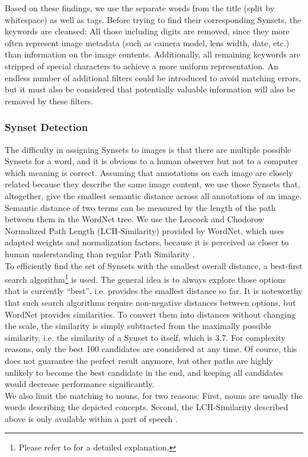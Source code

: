 Based on these findings, we use the separate words from the title (split by whitespace) as well as tags. Before trying to find their corresponding Synsets, the keywords are cleansed: All those including digits are removed, since they more often represent image metadata (such as camera model, lens width, date, etc.) than information on the image contents. Additionally, all remaining keywords are stripped of special characters to achieve a more uniform representation. An endless number of additional filters could be introduced to avoid matching errors, but it must also be considered that potentially valuable information will also be removed by these filters.\\

\subsubsection{Synset Detection}
\label{sec_synsetdetection}
The difficulty in assigning Synsets to images is that there are multiple possible Synsets for a word, and it is obvious to a human observer but not to a computer which meaning is correct. Assuming that annotations on each image are closely related because they describe the same image content, we use those Synsets that, altogether, give the smallest semantic distance across all annotations of an image. Semantic distance of two terms can be measured by the length of the path between them in the WordNet tree. We use the Leacock and Chodorow Normalized Path Length (LCH-Similarity) provided by WordNet, which uses adapted weights and normalization factors, because it is perceived as closer to human understanding than regular Path Similarity \cite{budanitsky01}. \\

To efficiently find the set of Synsets with the smallest overall distance, a best-first search algorithm\footnote{Please refer to \cite{kumar2008} for a detailed explanation.} is used. The general idea is to always explore those options that is currently ``best'', i.e. provides the smallest distance so far. It is noteworthy that such search algorithms require non-negative distances between options, but WordNet provides similarities. To convert them into distances without changing the scale, the similarity is simply subtracted from the maximally possible similarity, i.e. the similarity of a Synset to itself, which is 3.7.
For complexity reasons, only the best 100 candidates are considered at any time. Of course, this does not guarantee the perfect result anymore, but other paths are highly unlikely to become the best candidate in the end, and keeping all candidates would decrease performance significantly. \\
We also limit the matching to nouns, for two reasons: First, nouns are usually the words describing the depicted concepts. Second, the LCH-Similarity described above is only available within a part of speech \cite{pedersen2004wordnet}.

